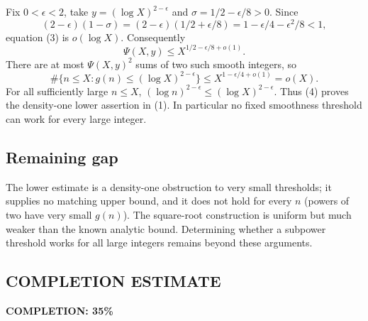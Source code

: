 Fix $0<\epsilon<2$, take $y=(\log X)^{2-\epsilon}$ and
$\sigma=1/2-\epsilon/8>0$. Since
\[
 (2-\epsilon)(1-\sigma)
 =(2-\epsilon)(1/2+\epsilon/8)
 =1-\epsilon/4-\epsilon^2/8<1,
\]
equation (3) is $o(\log X)$. Consequently
\[
 \Psi(X,y)\le X^{1/2-\epsilon/8+o(1)}.
\]
There are at most $\Psi(X,y)^2$ sums of two such smooth integers, so
\[
 \#\{n\le X:g(n)\le(\log X)^{2-\epsilon}\}
 \le X^{1-\epsilon/4+o(1)}=o(X). \tag{4}
\]
For all sufficiently large $n\le X$, $(\log n)^{2-\epsilon}\le(\log X)^{2-\epsilon}$. Thus (4) proves the density-one lower assertion in (1). In particular no fixed smoothness threshold can work for every large integer.

\subsection*{Remaining gap}
The lower estimate is a density-one obstruction to very small thresholds; it supplies no matching upper bound, and it does not hold for every $n$ (powers of two have very small $g(n)$). The square-root construction is uniform but much weaker than the known analytic bound. Determining whether a subpower threshold works for all large integers remains beyond these arguments.
\subsection*{COMPLETION ESTIMATE}
\textbf{COMPLETION: 35\%}
